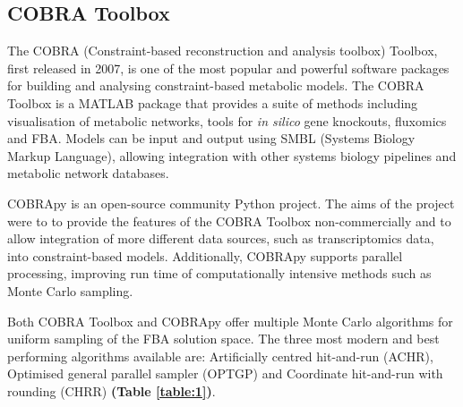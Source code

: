 \documentclass[10pt,letterpaper]{article}
\begin{document}
\subsection*{COBRA Toolbox}
The COBRA (Constraint-based reconstruction and analysis toolbox) Toolbox, first released in 2007, is one of the most popular and powerful software packages for building and analysing constraint-based metabolic models\cite{Schellenberger2011}. The COBRA Toolbox is a MATLAB package that provides a suite of methods including visualisation of metabolic networks, tools for \textit{in silico} gene knockouts, fluxomics and FBA. Models can be input and output using SMBL (Systems Biology Markup Language), allowing integration with other systems biology pipelines and metabolic network databases\cite{Schellenberger2011}.

COBRApy is an open-source community Python project. The aims of the project were to to provide the features of the COBRA Toolbox non-commercially and to allow integration of more different data sources, such as transcriptomics data, into constraint-based models. Additionally, COBRApy supports parallel processing, improving run time of computationally intensive methods such as Monte Carlo sampling\cite{Ebrahim}.

Both COBRA Toolbox and COBRApy offer multiple Monte Carlo algorithms for uniform sampling of the FBA solution space\cite{Schellenberger2011}\cite{Ebrahim}. The three most modern and best performing algorithms available are: Artificially centred hit-and-run (ACHR), Optimised general parallel sampler (OPTGP) and Coordinate hit-and-run with rounding (CHRR) \textbf{(Table \ref{table:1})}.

\end{document}
